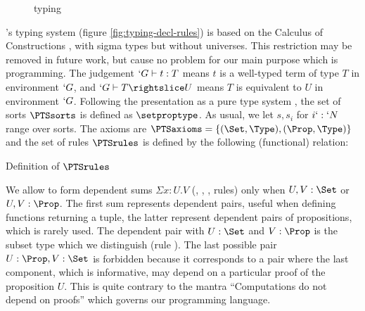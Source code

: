 \documentclass[twocolumn]{article}
\begin{document}
\begin{figure*}[t]
    \def\seq{\typed}
    \def\fCenter{\wf}
    \begin{center}
      \WfEmpty\DP\WfVar\DP
      \Var\DP
    \end{center}
    
    \def\fCenter{\typed}
    \begin{center}
      \PropSet\DP
      \Subsum\DP
    \end{center}
    
    \Prod\DP
    \SigmaR\DP

    \vspace{\infvspace}
    \Abs\DP
    \SumDep\DP

    \vspace{\infvspace}
    \quad\App\DP
    \quad\quad
    \PiLeft\DP
    \quad
    \PiRight\DP

    \begin{center}\SubsetR\DP\end{center}
    \caption{\Russell{} typing}
  \label{fig:typing-decl-rules}
\end{figure*}

\Russell{}'s typing system (figure \vref{fig:typing-decl-rules}) is based
on the Calculus of Constructions \cite{CoquandHuet,Barras99}, with sigma types but without universes.
This restriction may be removed in future work, but cause no problem for
our main purpose which is programming. The judgement $`G \vdash t : T$
means $t$ is a well-typed term of type $T$ in environment $`G$, and $`G
\typed T \subd U$ means $T$ is equivalent to $U$ in environment $`G$. 
Following the presentation as a pure type system \cite{PTS}, 
the set of sorts $\PTSsorts$ is defined as $\setproptype$. As usual, we
let $s, s_i$ for $i `: `N$ range over sorts. The
axioms are $\PTSaxioms = \{ (\Set, \Type), (\Prop, \Type) \}$ and the
set of rules $\PTSrules$ is defined by the following (functional) relation:
\begin{table}[h]
  \vspace{-1.5em}
  \axiomsd
  \vspace{-2em}
  \caption{Definition of $\PTSrules$}
  \label{fig:PTSrules}
\end{table}

We allow to form dependent sums $\Sigma x : U.V$ (, ,
,  rules) only when $U, V : \Set$
or $U, V : \Prop$. The first sum represents dependent pairs, useful
when defining functions returning a tuple, the latter represent
dependent pairs of propositions, which is rarely used. The dependent
pair with $U : \Set$ and $V : \Prop$ is the subset type which we
distinguish (rule ). The last possible pair $U : \Prop, V : \Set$ is forbidden
because it corresponds to a pair where the last component, which is
informative, may depend on a particular proof of the proposition
$U$. This is quite contrary to the mantra ``Computations do not depend
on proofs'' which governs our programming language.
\end{document}
